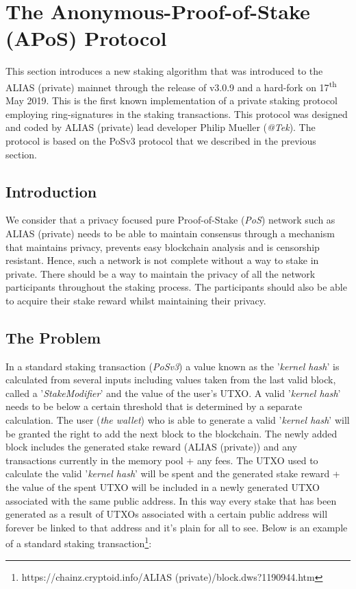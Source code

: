 \section{The Anonymous-Proof-of-Stake (APoS) Protocol}
This section introduces a new staking algorithm that was introduced to the
ALIAS (private) mainnet through the release of v3.0.9 and a hard-fork on
17\textsuperscript{th} May 2019. This is the first known implementation
of a private staking protocol employing ring-signatures in the staking
transactions. This protocol was designed and coded by ALIAS (private) lead
developer Philip Mueller (\textit{@Tek}). The protocol is based on the
PoSv3 protocol that we described in the previous section.



\subsection{Introduction}
We consider that a privacy focused pure Proof-of-Stake (\textit{PoS})
network such as ALIAS (private) needs to be able to maintain consensus through
a mechanism that maintains privacy, prevents easy blockchain analysis and
is censorship resistant. Hence, such a network is not complete without a
way to stake in private. There should be a way to maintain the privacy of
all the network participants throughout the staking process. The
participants should also be able to acquire their stake reward whilst
maintaining their privacy.



\subsection{The Problem}

In a standard staking transaction (\textit{PoSv3}) a value known as the
'\textit{kernel hash}' is calculated from several inputs including values
taken from the last valid block, called a '\textit{StakeModifier}' and
the value of the user's UTXO. A valid '\textit{kernel hash}' needs to be
below a certain threshold that is determined by a separate calculation.
The user (\textit{the wallet}) who is able to generate a valid
'\textit{kernel hash}' will be granted the right to add the next block
to the blockchain. The newly added block includes the generated stake
reward (ALIAS (private)) and any transactions currently in the memory pool + any
fees. The UTXO used to calculate the valid '\textit{kernel hash}' will
be spent and the generated stake reward + the value of the spent UTXO
will be included in a newly generated UTXO associated with the same public
address. In this way every stake that has been generated as a result of
UTXOs associated with a certain public address will forever be linked to
that address and it's plain for all to see. Below is an example of a
standard staking transaction\footnote{https://chainz.cryptoid.info/ALIAS (private)/block.dws?1190944.htm}:



